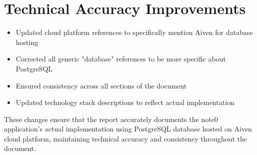 \documentclass[12pt, a4paper]{report}
\begin{document}
\section{Technical Accuracy Improvements}
\begin{itemize}
    \item Updated cloud platform references to specifically mention Aiven for database hosting
    \item Corrected all generic "database" references to be more specific about PostgreSQL
    \item Ensured consistency across all sections of the document
    \item Updated technology stack descriptions to reflect actual implementation
\end{itemize}

These changes ensure that the report accurately documents the note0 application's actual implementation using PostgreSQL database hosted on Aiven cloud platform, maintaining technical accuracy and consistency throughout the document.

\newpage
\end{document}
